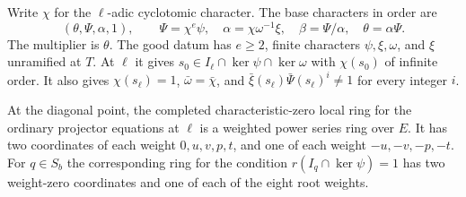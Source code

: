 Write \(\chi\) for the \(\ell\)-adic cyclotomic character.
The base characters in order are
\[
 (\theta,\Psi,\alpha,1),\qquad
 \Psi=\chi^e\psi,\quad\alpha=\chi\omega^{-1}\xi,\quad
 \beta=\Psi/\alpha,\quad\theta=\alpha\Psi .
\]
The multiplier is \(\theta\). The good datum has \(e\ge2\), finite
characters \(\psi,\xi,\omega\), and \(\xi\) unramified at \(T\).
At \(\ell\) it gives \(s_0\in I_\ell\cap\ker\psi\cap\ker\omega\)
with \(\chi(s_0)\) of infinite order. It also gives
\(\chi(s_\ell)=1\), \(\bar\omega=\bar\chi\), and
\(\bar\xi(s_\ell)\bar\Psi(s_\ell)^i\ne1\) for every integer \(i\).

\begin{proposition}\label{dp:local}
At the diagonal point, the completed characteristic-zero local ring
for the ordinary projector equations at \(\ell\) is a weighted power
series ring over \(E\). It has two coordinates of each weight
\(0,u,v,p,t\), and one of each weight \(-u,-v,-p,-t\).
For \(q\in S_b\) the corresponding ring for the condition
\(r(I_q\cap\ker\psi)=1\) has two weight-zero coordinates and one
of each of the eight root weights.
\end{proposition}

